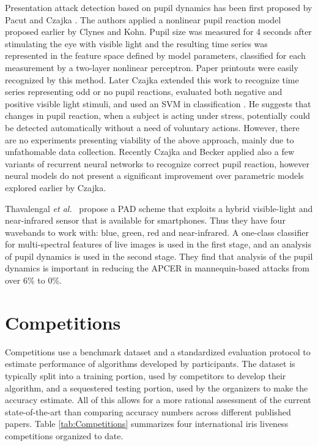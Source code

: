 \documentclass[format=acmsmall, review=false, timestamp=false]{acmart}
\newcommand{\etal}{{\it et al.}~}
\begin{document}
{P}resentation attack detection based on pupil dynamics has been first proposed by Pacut and Czajka \cite{Pacut_ICCST_2006,Czajka_SPIE_2007,Czajka_patent_2011}. The authors applied a nonlinear pupil reaction model proposed earlier by Clynes and Kohn. Pupil size was measured for 4 seconds after stimulating the eye with visible light and the resulting time series was represented in the feature space defined by model parameters, {classified} for each measurement by a two-layer nonlinear perceptron. {P}aper printouts were easily recognized by this method. Later Czajka extended this work to recognize time series representing odd or no pupil reactions, evaluated both negative and positive visible light stimuli, and used an SVM in classification \cite{Czajka_TIFS_2015,Czajka_Handbook_2016}. He suggests that changes in pupil reaction, when a subject is acting under stress, potentially could be detected automatically without a need of voluntary actions. However, there are no experiments presenting viability of the above approach, mainly due to unfathomable data collection{.} {Recently Czajka and Becker \cite{Czajka_PAD_Handbook_2018} applied also a few variants of recurrent neural networks to recognize correct pupil reaction, however neural models do not present a significant improvement over parametric models explored earlier by Czajka}.

Thavalengal \etal \cite{Thavalengal_TCE_2016} propose a PAD scheme that exploits a hybrid visible-light and near-{infrared} sensor that is available for smartphones. Thus they have four wavebands to work with: blue, green, red and near-{infrared}. A one-class classifier for multi-spectral features of live images is used in the first stage, and an analysis of pupil dynamics is used in the second stage. They find that analysis of the pupil dynamics is important in reducing the APCER in mannequin-based attacks from over 6\% to 0\%.









\section{Competitions}
\label{sec:Competitions}

Competitions use a benchmark dataset and a standardized evaluation protocol to estimate performance of algorithms developed by participants. The dataset is typically split into a training portion, used by competitors to develop their algorithm, and a sequestered testing portion, used by the organizers to make the accuracy estimate. All of this allows for a more rational assessment of the current state-of-the-art than comparing accuracy numbers across different published papers. Table \ref{tab:Competitions} summarizes four international iris liveness competitions organized to date.
\end{document}
